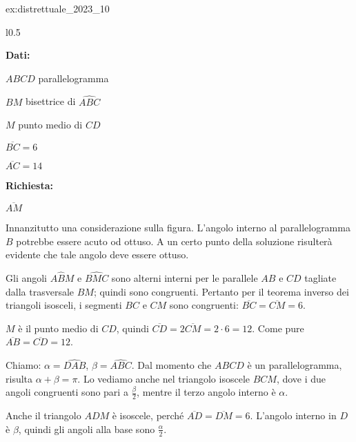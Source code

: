 \begin{soluzione}{ex:distrettuale_2023_10}
\begin{wrapfigure}{l}{0.5\textwidth}
    \end{wrapfigure}

    \textbf{Dati:}

    $ABCD$ parallelogramma

    $BM$ bisettrice di $\hat{ABC}$

    $M$ punto medio di $CD$

    $\overline{BC} = 6$

    $\overline{AC} = 14$

    \textbf{Richiesta:}

    $\overline{AM}$

    \bigskip
    Innanzitutto una considerazione sulla figura.
    L'angolo interno al parallelogramma $B$ potrebbe essere acuto od ottuso.
    A un certo punto della soluzione risulterà evidente che tale angolo deve essere ottuso.

    Gli angoli $A\hat{B}M$ e $\hat{BMC}$ sono alterni interni per le parallele $AB$ e $CD$ tagliate dalla
    trasversale $BM$;
    quindi sono congruenti.
    Pertanto per il teorema inverso dei triangoli isosceli, i segmenti $BC$ e $CM$ sono congruenti:
    $\overline{BC} = \overline{CM} = 6$.

    $M$ è il punto medio di $CD$, quindi $\overline{CD} = 2 \overline{CM} = 2 \cdot 6 = 12$.
    Come pure $\overline{AB} = \overline{CD} = 12$.

    Chiamo: $\alpha = \hat{DAB}$, $\beta = \hat{ABC}$.
    Dal momento che $ABCD$ è un parallelogramma, risulta $\alpha + \beta = \pi$.
    Lo vediamo anche nel triangolo isoscele $BCM$, dove i due angoli congruenti sono pari a $\frac{\beta}{2}$, mentre
    il terzo angolo interno è $\alpha$.

    Anche il triangolo $ADM$ è isoscele, perché $\overline{AD} = \overline{DM} = 6$.
    L'angolo interno in $D$ è $\beta$, quindi gli angoli alla base sono $\frac{\alpha}{2}$.


\end{soluzione}
